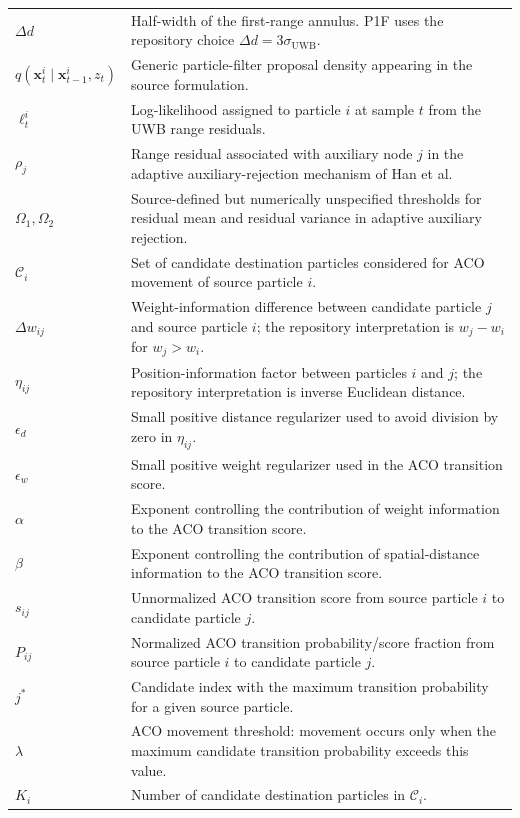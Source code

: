 \begin{longtable}{p{}p{}}
$\Delta d$ & Half-width of the first-range annulus. P1F uses the repository choice $\Delta d=3\sigma_{\mathrm{UWB}}$.\\
$q(\bm x_t^i\mid\bm x_{t-1}^i,z_t)$ & Generic particle-filter proposal density appearing in the source formulation.\\
$\ell_t^i$ & Log-likelihood assigned to particle $i$ at sample $t$ from the UWB range residuals.\\
$\rho_j$ & Range residual associated with auxiliary node $j$ in the adaptive auxiliary-rejection mechanism of Han et al.\\
$\Omega_1,\Omega_2$ & Source-defined but numerically unspecified thresholds for residual mean and residual variance in adaptive auxiliary rejection.\\
$\mathcal C_i$ & Set of candidate destination particles considered for ACO movement of source particle $i$.\\
$\Delta w_{ij}$ & Weight-information difference between candidate particle $j$ and source particle $i$; the repository interpretation is $w_j-w_i$ for $w_j>w_i$.\\
$\eta_{ij}$ & Position-information factor between particles $i$ and $j$; the repository interpretation is inverse Euclidean distance.\\
$\epsilon_d$ & Small positive distance regularizer used to avoid division by zero in $\eta_{ij}$.\\
$\epsilon_w$ & Small positive weight regularizer used in the ACO transition score.\\
$\alpha$ & Exponent controlling the contribution of weight information to the ACO transition score.\\
$\beta$ & Exponent controlling the contribution of spatial-distance information to the ACO transition score.\\
$s_{ij}$ & Unnormalized ACO transition score from source particle $i$ to candidate particle $j$.\\
$P_{ij}$ & Normalized ACO transition probability/score fraction from source particle $i$ to candidate particle $j$.\\
$j^*$ & Candidate index with the maximum transition probability for a given source particle.\\
$\lambda$ & ACO movement threshold: movement occurs only when the maximum candidate transition probability exceeds this value.\\
$K_i$ & Number of candidate destination particles in $\mathcal C_i$.\\

\end{longtable}
